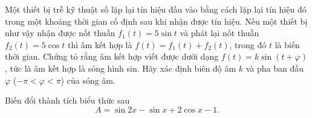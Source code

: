 \begin{vd}%
	Một thiết bị trễ kỹ thuật số lặp lại tín hiệu đầu vào bằng cách lặp lại tín hiệu đó trong một khoảng thời gian cố định sau khi nhận được tín hiệu. Nếu một thiết bị như vậy nhận được nốt thuần $f_1(t) = 5\sin t$ và phát lại nốt thuần $f_2(t) = 5\cos t$ thì âm kết hợp là $f(t)=f_1(t)+f_2(t)$, trong đó $t$ là biến thời gian. Chứng tỏ rằng âm kết hợp viết được dưới dạng $f(t) = k\sin(t+\varphi)$, tức là âm kết hợp là sóng hình sin. Hãy xác định biên độ âm $k$ và pha ban đầu $\varphi$ ($-\pi < \varphi <\pi$) của sóng âm.
\end{vd}

\begin{vd}%
	Biến đổi thành tích biểu thức sau
	\[A=\sin 2x-\sin x+2\cos x-1.\]
\end{vd}

